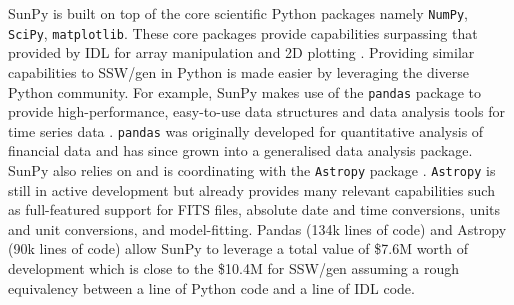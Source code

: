 SunPy is built on top of the core scientific Python packages namely 
\texttt{NumPy}, \texttt{SciPy}, \texttt{matplotlib}. These core packages 
provide capabilities surpassing that provided by IDL for array manipulation and 
2D plotting \citep{greenfield2011}. Providing similar capabilities to SSW/gen 
in Python is made easier by leveraging the diverse Python community. For 
example, SunPy makes use of the \texttt{pandas} package to provide 
high-performance, easy-to-use data structures and data analysis tools for time 
series data \citep{mckinney2012}. \texttt{pandas} was originally developed for 
quantitative analysis of financial data and has since grown into a generalised 
data analysis package. SunPy also relies on and is coordinating with the 
\texttt{Astropy} package \citep{theastropycollaboration2013}. \texttt{Astropy} is still in 
active development but already provides many relevant capabilities such as 
full-featured support for FITS files, absolute date and time conversions, 
units and unit conversions, and model-fitting. Pandas (134k lines of code) 
and Astropy (90k lines of code) allow SunPy to leverage a total value of \$7.6M 
worth of development which is close to the \$10.4M for SSW/gen assuming a rough 
equivalency between a line of Python code and a line of IDL code. 
